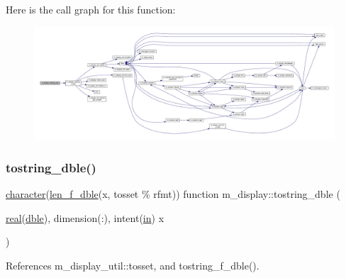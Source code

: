 Here is the call graph for this function\+:
\nopagebreak
\begin{figure}[H]
\begin{center}
\leavevmode
\includegraphics[width=350pt]{namespacem__display_a1b05d11dd12d88ce00f912751be126f3_cgraph}
\end{center}
\end{figure}
\mbox{\label{namespacem__display_a0b5ebf70cd08a5bffc132707049bcef6}} 
\subsubsection{\texorpdfstring{tostring\+\_\+dble()}{tostring\_dble()}}
{\footnotesize\ttfamily \hyperlink{option__stopwatch_83_8txt_abd4b21fbbd175834027b5224bfe97e66}{character}(\hyperlink{namespacem__display_aa013a639d5b0f7e40b627c9d712693f0}{len\+\_\+f\+\_\+dble}(x, tosset \% rfmt)) function m\+\_\+display\+::tostring\+\_\+dble (\begin{DoxyParamCaption}\item[{\hyperlink{read__watch_83_8txt_abdb62bde002f38ef75f810d3a905a823}{real}(\hyperlink{namespacem__display_a46d90b75b6ccef7ccade133e5847e815}{dble}), dimension(\+:), intent(\hyperlink{M__journal_83_8txt_afce72651d1eed785a2132bee863b2f38}{in})}]{x }\end{DoxyParamCaption})\hspace{0.3cm}{\ttfamily [private]}}



References m\+\_\+display\+\_\+util\+::tosset, and tostring\+\_\+f\+\_\+dble().

